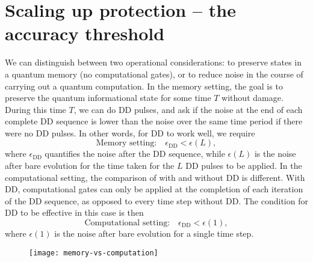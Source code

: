 \documentclass[pra,reprint,superscriptaddress]{revtex4-2}
\begin{document}
\section{Scaling up protection -- the accuracy threshold}\label{sec:threshold}
We can distinguish between two operational considerations: to preserve states in a quantum memory (no computational gates), or to reduce noise in the course of carrying out a quantum computation. In the memory setting, the goal is to preserve the quantum informational state for some time $T$ without damage. During this time $T$, we can do DD pulses, and ask if the noise at the end of each complete DD sequence is lower than the noise over the same time period if there were no DD pulses. In other words, for DD to work well, we require
\begin{equation}
\textrm{Memory setting:}\quad \epsilon_\mathrm{DD}<\epsilon(L),
\end{equation}
where $\epsilon_\mathrm{DD}$ quantifies the noise after the DD sequence, while $\epsilon(L)$ is the noise after bare evolution for the time taken for the $L$ DD pulses to be applied.
In the computational setting, the comparison of with and without DD is different. With DD, computational gates can only be applied at the completion of each iteration of the DD sequence, as opposed to every time step without DD. The condition for DD to be effective in this case is then
\begin{equation}\label{eq:cond}
\textrm{Computational setting:}\quad\epsilon_\mathrm{DD}<\epsilon(1),
\end{equation}
where $\epsilon(1)$ is the noise after bare evolution for a single time step. 

\begin{figure}[htbp]
 \centering
 \texttt{[image: memory-vs-computation]}
 \caption{}
 \label{fig:memvscom}
\end{figure}
\end{document}
